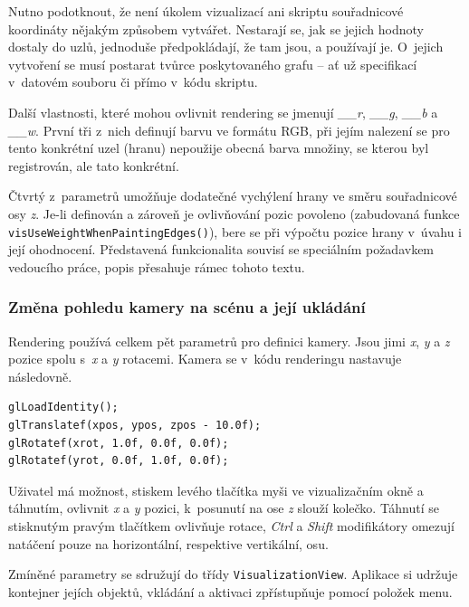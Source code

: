 \documentclass[11pt,twoside,a4paper]{book}
\begin{document}
Nutno podotknout, že není úkolem vizualizací ani skriptu souřadnicové koordináty nějakým způsobem vytvářet. Nestarají se, jak se jejich hodnoty dostaly do uzlů, jednoduše před\-po\-klá\-da\-jí, že tam jsou, a používají je. O~jejich vytvoření se musí postarat tvůrce poskytovaného grafu -- ať už specifikací v~datovém souboru či přímo v~kódu skriptu.

Další vlastnosti, které mohou ovlivnit rendering se jmenují \textit{\_\_r}, \textit{\_\_g}, \textit{\_\_b} a \textit{\_\_w}. První tři z~nich definují barvu ve formátu RGB, při jejím nalezení se pro tento konkrétní uzel (hranu) nepoužije obecná barva množiny, se kterou byl registrován, ale tato konkrétní.

Čtvrtý z~parametrů umožňuje dodatečné vychýlení hrany ve směru souřadnicové osy \textit{z}. Je-li definován a zároveň je ovlivňování pozic povoleno (zabudovaná funkce \texttt{vis\-Use\-Weight\-When\-Pa\-in\-ting\-Ed\-ges()}), bere se při výpočtu pozice hrany v~úvahu i její ohodnocení. Představená funkcionalita souvisí se speciálním požadavkem vedoucího práce, popis přesahuje rámec tohoto textu.


\subsubsection{Změna pohledu kamery na scénu a její ukládání}

Rendering používá celkem pět parametrů pro definici kamery. Jsou jimi \textit{x}, \textit{y} a \textit{z} pozice spolu s~\textit{x} a \textit{y} rotacemi. Kamera se v~kódu renderingu nastavuje následovně.

\begin{verbatim}
glLoadIdentity();
glTranslatef(xpos, ypos, zpos - 10.0f);
glRotatef(xrot, 1.0f, 0.0f, 0.0f);
glRotatef(yrot, 0.0f, 1.0f, 0.0f);
\end{verbatim}

Uživatel má možnost, stiskem levého tlačítka myši ve vizualizačním okně a táhnutím, ovlivnit \textit{x} a \textit{y} pozici, k~posunutí na ose \textit{z} slouží kolečko. Táhnutí se stisknutým pravým tlačítkem ovlivňuje rotace, \textit{Ctrl} a \textit{Shift} modifikátory omezují natáčení pouze na horizontální, respektive vertikální, osu.

Zmíněné parametry se sdružují do třídy \texttt{VisualizationView}. Aplikace si udržuje kontejner jejích objektů, vkládání a aktivaci zpřístupňuje pomocí položek menu.
\end{document}
